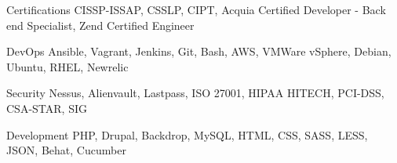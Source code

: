 


\begin{cvskills}


\cvskill
{Certifications}
{CISSP-ISSAP, CSSLP, CIPT, Acquia Certified Developer - Back end Specialist, Zend Certified Engineer }

\cvskill
{DevOps}
{Ansible, Vagrant, Jenkins, Git, Bash, AWS, VMWare vSphere, Debian, Ubuntu, RHEL, Newrelic }

\cvskill
{Security}
{Nessus, Alienvault, Lastpass, ISO 27001, HIPAA HITECH, PCI-DSS, CSA-STAR, SIG }

\cvskill
{Development}
{PHP, Drupal, Backdrop, MySQL, HTML, CSS, SASS, LESS, JSON, Behat, Cucumber }




\end{cvskills}
